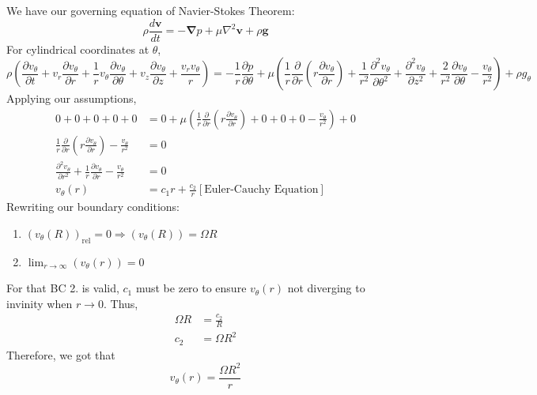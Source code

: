 \documentclass{article}
\begin{document}
We have our governing equation of Navier-Stokes Theorem:
\begin{equation}
    \rho \frac{d \mathbf{v}}{dt} = -\mathbf{\nabla}p + \mu \nabla^2 \mathbf{v} + \rho \mathbf{g}
\end{equation}
For cylindrical coordinates at $\theta$,
\begin{equation}
    \rho\left( \frac{\partial v_\theta}{\partial t} + v_r \frac{\partial v_\theta}{\partial r} + \frac{1}{r} v_\theta \frac{\partial v_\theta}{\partial \theta} + v_z \frac{\partial v_\theta}{\partial z} + \frac{v_r v_\theta}{r}\right) = -\frac{1}{r} \frac{\partial p}{\partial \theta} + \mu \left(\frac{1}{r} \frac{\partial}{\partial r}\left(r \frac{\partial v_\theta}{\partial r}\right) + \frac{1}{r^2} \frac{\partial^2 v_\theta}{\partial \theta^2} + \frac{\partial^2 v_\theta}{\partial z^2} + \frac{2}{r^2} \frac{\partial v_\theta}{\partial \theta} - \frac{v_\theta}{r^2}\right) + \rho g_\theta
\end{equation}
Applying our assumptions,
\begin{align*}
    0 + 0 + 0 + 0 + 0 &= 0 + \mu \left(\frac{1}{r} \frac{\partial}{\partial r}\left(r \frac{\partial v_\theta}{\partial r}\right) + 0 + 0 + 0 - \frac{v_\theta}{r^2}\right) + 0 \\
    \frac{1}{r} \frac{\partial}{\partial r}\left(r \frac{\partial v_\theta}{\partial r}\right) - \frac{v_\theta}{r^2} &= 0 \\
    \frac{\partial^2 v_\theta}{\partial r^2} + \frac{1}{r} \frac{\partial v_\theta}{\partial r} - \frac{v_\theta}{r^2} &= 0 \\
    v_\theta (r) &= c_1 r + \frac{c_2}{r} \left[\textrm{Euler-Cauchy Equation}\right]
\end{align*}
Rewriting our boundary conditions:
\begin{enumerate}
    \item $(v_\theta (R))_{\textrm{rel}} = 0 \Rightarrow (v_\theta (R)) = \Omega R$
    \item $\lim_{r \rightarrow \infty} (v_\theta (r)) = 0$
\end{enumerate}
For that BC 2. is valid, $c_1$ must be zero to ensure $v_\theta (r)$ not diverging to invinity when $r \rightarrow 0$. Thus,
\begin{align*}
    \Omega R &= \frac{c_2}{R} \\
    c_2 &= \Omega R^2
\end{align*}
Therefore, we got that
\begin{equation*}
    v_\theta (r) = \frac{\Omega R^2}{r}
\end{equation*}
    
\end{document}
